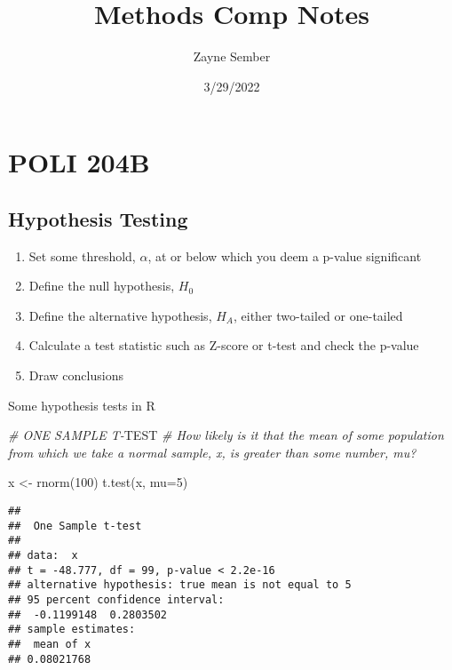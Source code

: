 \documentclass[
]{article}
\title{Methods Comp Notes}
\author{Zayne Sember}
\date{3/29/2022}
\newenvironment{Shaded}{\begin{snugshade}}{\end{snugshade}}
\newcommand{\AlertTok}[1]{\textcolor[rgb]{0.94,0.16,0.16}{#1}}
\newcommand{\AttributeTok}[1]{\textcolor[rgb]{0.77,0.63,0.00}{#1}}
\newcommand{\CommentTok}[1]{\textcolor[rgb]{0.56,0.35,0.01}{\textit{#1}}}
\newcommand{\DecValTok}[1]{\textcolor[rgb]{0.00,0.00,0.81}{#1}}
\newcommand{\FunctionTok}[1]{\textcolor[rgb]{0.00,0.00,0.00}{#1}}
\newcommand{\NormalTok}[1]{#1}
\newcommand{\OtherTok}[1]{\textcolor[rgb]{0.56,0.35,0.01}{#1}}
\begin{document}
\maketitle

\hypertarget{poli-204b}{%
\section{POLI 204B}\label{poli-204b}}

\hypertarget{hypothesis-testing}{%
\subsection{Hypothesis Testing}\label{hypothesis-testing}}

\begin{enumerate}
\def\labelenumi{\arabic{enumi}.}
\item
  Set some threshold, \(\alpha\), at or below which you deem a p-value
  significant
\item
  Define the null hypothesis, \(H_0\)
\item
  Define the alternative hypothesis, \(H_A\), either two-tailed or
  one-tailed
\item
  Calculate a test statistic such as Z-score or t-test and check the
  p-value
\item
  Draw conclusions
\end{enumerate}

Some hypothesis tests in R

\begin{Shaded}
\begin{Highlighting}[]
\CommentTok{\# ONE SAMPLE T{-}}\AlertTok{TEST}
\CommentTok{\# How likely is it that the mean of some population from which we take a normal sample, x, is greater than some number, mu?}

\NormalTok{x }\OtherTok{\textless{}{-}} \FunctionTok{rnorm}\NormalTok{(}\DecValTok{100}\NormalTok{)}
\FunctionTok{t.test}\NormalTok{(x, }\AttributeTok{mu=}\DecValTok{5}\NormalTok{)}
\end{Highlighting}
\end{Shaded}

\begin{verbatim}
## 
##  One Sample t-test
## 
## data:  x
## t = -48.777, df = 99, p-value < 2.2e-16
## alternative hypothesis: true mean is not equal to 5
## 95 percent confidence interval:
##  -0.1199148  0.2803502
## sample estimates:
##  mean of x 
## 0.08021768
\end{verbatim}
\end{document}
